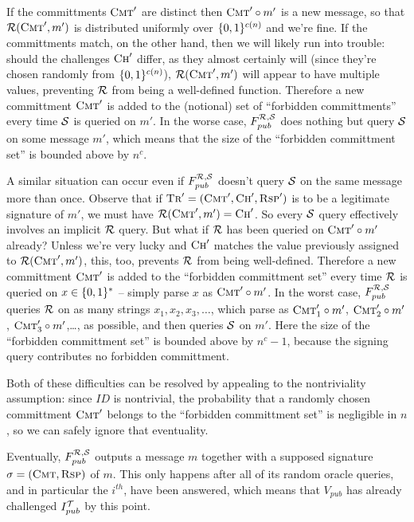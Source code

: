 \documentclass[12pt,twoside]{article}
\begin{document}
\begin{enumerate}
If the committments $\textsc{Cmt}'$ are distinct then $\textsc{Cmt}'\circ m'$ 
is a new message, so that $\mathcal{R}(\textsc{Cmt}',m')$ is distributed uniformly 
over $\{0,1\}^{c(n)}$ and we're fine. If the committments match, on the other 
hand, then we will likely run into trouble: should the challenges 
$\textsc{Ch}'$ differ, as they almost certainly will (since they're chosen
randomly from $\{0,1\}^{c(n)}$), $\mathcal{R}(\textsc{Cmt}',m')$ 
will appear to have multiple values, preventing $\mathcal{R}$ from being a
well-defined function. Therefore a new committment $\textsc{Cmt}'$ is added to
the (notional) set of ``forbidden committments'' every time $\mathcal{S}$ is queried
on $m'$. In the worse case, $F_{pub}^{\mathcal{R},\mathcal{S}}$ does nothing but query
$\mathcal{S}$ on some message $m'$, which means that the size of the ``forbidden
committment set'' is bounded above by $n^c$.

A similar situation can occur even if $F_{pub}^{\mathcal{R},\mathcal{S}}$ doesn't query
$\mathcal{S}$ on the same message more than once. Observe that if $\textsc{Tr}' =
(\textsc{Cmt}',\textsc{Ch}',\textsc{Rsp}')$ is to be a legitimate signature of
$m'$, we must have $\mathcal{R}(\textsc{Cmt}',m') = \textsc{Ch}'$. So every $\mathcal{S}$
query effectively involves an implicit $\mathcal{R}$ query. But what if $\mathcal{R}$ has
been queried on $\textsc{Cmt}'\circ m'$ already? Unless we're very lucky and
$\textsc{Ch}'$ matches the value previously assigned to
$\mathcal{R}(\textsc{Cmt}',m')$, this, too, prevents $\mathcal{R}$ from being
well-defined. Therefore a new committment $\textsc{Cmt}'$ is added to the 
``forbidden committment set'' every time $\mathcal{R}$ is queried on $x \in \{0,1\}^{*}$
 -- simply parse $x$ as $\textsc{Cmt}'\circ m'$. In the worst case, 
$F_{pub}^{\mathcal{R},\mathcal{S}}$ queries $\mathcal{R}$ on as many strings 
$x_1,x_2,x_3,\ldots$, which parse as $\textsc{Cmt}_1'\circ m'$, 
$\textsc{Cmt}_2'\circ m'$, $\textsc{Cmt}_3'\circ m'$,\ldots, as possible, and 
then queries $\mathcal{S}$ on $m'$. Here the size of the ``forbidden committment
set'' is bounded above by $n^c - 1$, because the signing query contributes no 
forbidden committment.

Both of these difficulties can be resolved by appealing to the nontriviality
assumption: since $ID$ is nontrivial, the probability that a randomly chosen
committment $\textsc{Cmt}'$ belongs to the ``forbidden committment set'' is 
negligible in $n$, so we can safely ignore that eventuality. 

Eventually, $F_{pub}^{\mathcal{R},\mathcal{S}}$ outputs a message $m$ together with a
supposed signature $\sigma = (\textsc{Cmt},\textsc{Rsp})$ of $m$. This only 
happens after all of its random oracle queries, and in particular the $i^{th}$, 
have been answered, which means that $V_{pub}$ has already challenged 
$I_{pub}^{\mathcal{T}}$ by this point. 


\end{enumerate}
\end{document}
